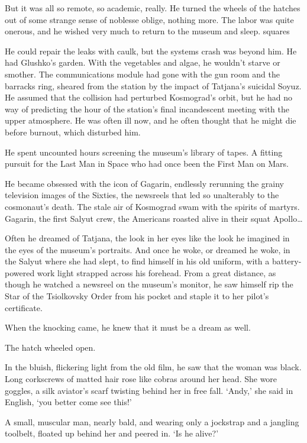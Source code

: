 But it was all so remote, so academic, really. He turned the wheels of the hatches out of some strange sense of noblesse oblige, nothing more. The labor was quite onerous, and he wished very much to return to the museum and sleep.
squares

He could repair the leaks with caulk, but the systems crash was beyond him. He had Glushko's garden. With the vegetables and algae, he wouldn't starve or smother. The communications module had gone with the gun room and the barracks ring, sheared from the station by the impact of Tatjana's suicidal Soyuz. He assumed that the collision had perturbed Kosmograd's orbit, but he had no way of predicting the hour of the station's final incandescent meeting with the upper atmosphere. He was often ill now, and he often thought that he might die before burnout, which disturbed him.

He spent uncounted hours screening the museum's library of tapes. A fitting pursuit for the Last Man in Space who had once been the First Man on Mars.

He became obsessed with the icon of Gagarin, endlessly rerunning the grainy television images of the Sixties, the newsreels that led so unalterably to the cosmonaut's death. The stale air of Kosmograd swam with the spirits of martyrs. Gagarin, the first Salyut crew, the Americans roasted alive in their squat Apollo\ldots

Often he dreamed of Tatjana, the look in her eyes like the look he imagined in the eyes of the museum's portraits. And once he woke, or dreamed he woke, in the Salyut where she had slept, to find himself in his old uniform, with a battery-powered work light strapped across his forehead. From a great distance, as though he watched a newsreel on the museum's monitor, he saw himself rip the Star of the Tsiolkovsky Order from his pocket and staple it to her pilot's certificate.

When the knocking came, he knew that it must be a dream as well.

The hatch wheeled open.

In the bluish, flickering light from the old film, he saw that the woman was black. Long corkscrews of matted hair rose like cobras around her head. She wore goggles, a silk aviator's scarf twisting behind her in free fall. `Andy,' she said in English, `you better come see this!'

A small, muscular man, nearly bald, and wearing only a jockstrap and a jangling toolbelt, floated up behind her and peered in. `Is he alive?'

